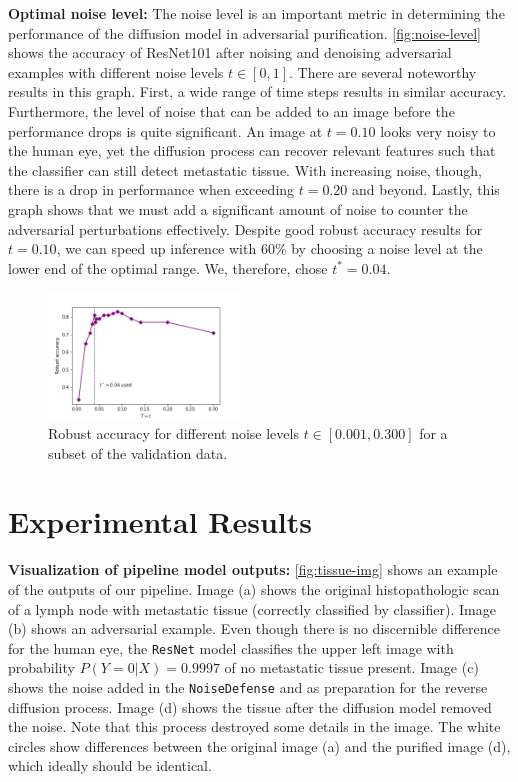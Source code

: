 \documentclass[twocolumn]{article}
\begin{document}
\textbf{Optimal noise level:}
The noise level is an important metric in determining the performance of the diffusion model in adversarial purification. \autoref{fig:noise-level} shows the accuracy of ResNet101 after noising and denoising adversarial examples with different noise levels $t\in[0, 1]$. There are several noteworthy results in this graph. First, a wide range of time steps results in similar accuracy. Furthermore, the level of noise that can be added to an image before the performance drops is quite significant. An image at $t=0.10$ looks very noisy to the human eye, yet the diffusion process can recover relevant features such that the classifier can still detect metastatic tissue. With increasing noise, though, there is a drop in performance when exceeding $t=0.20$ and beyond. Lastly, this graph shows that we must add a significant amount of noise to counter the adversarial perturbations effectively. Despite good robust accuracy results for $t=0.10$, we can speed up inference with 60\% by choosing a noise level at the lower end of the optimal range. We, therefore, chose $t^*=0.04$.



\begin{figure}
    \includegraphics[width=0.45\textwidth]{Figures/noise_cv.png}
    \caption{Robust accuracy for different noise levels $t\in[0.001, 0.300]$ for a subset of the validation data.}
    \label{fig:noise-level}
\end{figure}


\section{Experimental Results}


\textbf{Visualization of pipeline model outputs:}
\autoref{fig:tissue-img} shows an example of the outputs of our pipeline. Image (a) shows the original histopathologic scan of a lymph node with metastatic tissue (correctly classified by classifier). Image (b) shows an adversarial example. Even though there is no discernible difference for the human eye, the \texttt{ResNet} model classifies the upper left image with probability $P(Y=0|X)=0.9997$ of no metastatic tissue present. Image (c) shows the noise added in the \texttt{NoiseDefense} and as preparation for the reverse diffusion process. Image (d) shows the tissue after the diffusion model removed the noise. Note that this process destroyed some details in the image. The white circles show differences between the original image (a) and the purified image (d), which ideally should be identical.
\end{document}
